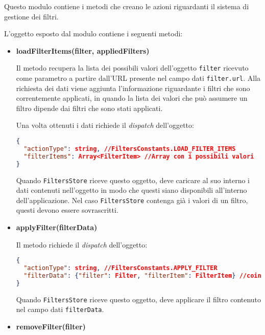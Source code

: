 
Questo modulo contiene i metodi che creano le azioni riguardanti il sistema di gestione dei filtri.

L'oggetto esposto dal modulo contiene i seguenti metodi:
\begin{itemize}
\item \textbf{loadFilterItems(filter, appliedFilters)}

Il metodo recupera la lista dei possibili valori dell'oggetto \texttt{filter} ricevuto come parametro a partire dall'URL presente nel campo dati \texttt{filter.url}. 
Alla richiesta dei dati viene aggiunta l'informazione riguardante i filtri che sono correntemente applicati, in quando la lista dei valori che può assumere un filtro dipende dai filtri che sono stati applicati.

Una volta ottenuti i dati richiede il \textit{dispatch} dell'oggetto:
\begin{lstlisting}[language=JSON, caption=Action - load filter items]
{
  "actionType": string, //FiltersConstants.LOAD_FILTER_ITEMS
  "filterItems": Array<FilterItem> //Array con i possibili valori
}
\end{lstlisting}

Quando \texttt{FiltersStore} riceve questo oggetto, deve caricare al suo interno i dati contenuti nell'oggetto in modo che questi siano disponibili all'interno dell'applicazione. Nel caso \texttt{FiltersStore} contenga già i valori di un filtro, questi devono essere sovrascritti.

\item \textbf{applyFilter(filterData)}

Il metodo richiede il \textit{dispatch} dell'oggetto:
\begin{lstlisting}[language=JSON, caption=Action - apply filter]
{
  "actionType": string, //FiltersConstants.APPLY_FILTER
  "filterData": {"filter": Filter, "filterItem": FilterItem} //coincide con l'oggetto ricevuto come parametro
}
\end{lstlisting}

Quando \texttt{FiltersStore} riceve questo oggetto, deve applicare il filtro contenuto nel campo dati \texttt{filterData}.

\item \textbf{removeFilter(filter)}


\end{itemize}
